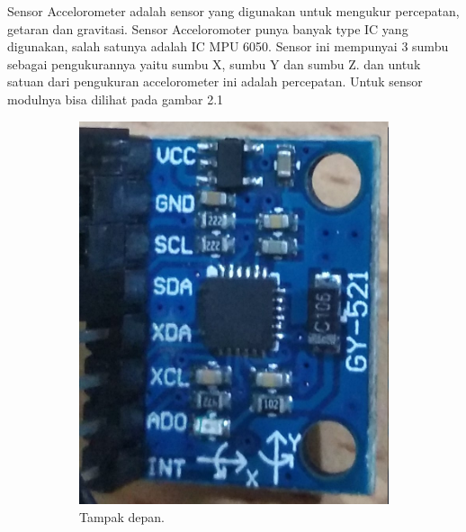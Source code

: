 \documentclass[11pt]{article}
\numberwithin{equation}{subsection}
\begin{document}
Sensor Accelorometer adalah sensor yang digunakan untuk mengukur percepatan, getaran dan gravitasi.
Sensor Acceloromoter punya banyak type IC yang digunakan, salah satunya adalah IC MPU 6050.
Sensor ini mempunyai 3 sumbu sebagai pengukurannya yaitu sumbu X, sumbu Y dan sumbu Z.
dan untuk satuan dari pengukuran accelorometer ini adalah percepatan.
Untuk sensor modulnya bisa dilihat pada gambar 2.1
\begin{figure}[h!]
	\centering
	\begin{subfigure}[b]{0.4\linewidth}
		\includegraphics[width=\linewidth]{dokumentasi/MPU6050/mpu6050.jpg}
		\caption{Tampak depan.}
	\end{subfigure}
	\begin{subfigure}[b]{0.35\linewidth}

\end{subfigure}
\end{figure}
\end{document}
